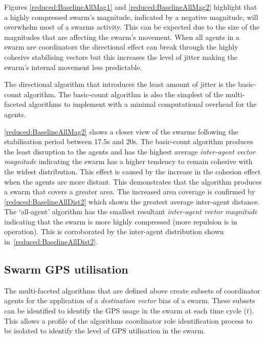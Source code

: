 Figures \ref{reduced:BaselineAllMag1} and \ref{reduced:BaselineAllMag2} highlight that a highly compressed swarm's magnitude, indicated by a negative magnitude, will overwhelm most of a swarms activity. This can be expected due to the size of the magnitudes that are affecting the swarm's movement. When all agents in a swarm are coordinators the directional effect can break through the highly cohesive stabilising vectors but this increases the level of jitter making the swarm's internal movement less predictable.

The directional algorithm that introduces the least amount of jitter is the basic-count algorithm. The basic-count algorithm is also the simplest of the multi-faceted algorithms to implement with a minimal computational overhead for the agents. 

\autoref{reduced:BaselineAllMag2} shows a closer view of the swarms following the stabilisation period between 17.5s and 20s. The basic-count algorithm produces the least disruption to the agents and has the highest average \textit{inter-agent vector magnitude} indicating the swarm has a higher tendency to remain cohesive with the widest distribution. This effect is caused by the increase in the cohesion effect when the agents are more distant. This demonstrates that the algorithm produces a swarm that covers a greater area. The increased area coverage is confirmed by \autoref{reduced:BaselineAllDist2} which shown the greatest average inter-agent distance. The `all-agent' algorithm has the smallest resultant \textit{inter-agent vector magnitude} indicating that the swarm is more highly compressed (more repulsion is in operation). This is corroborated by the inter-agent distribution shown in~\autoref{reduced:BaselineAllDist2}.

\subsection{Swarm GPS utilisation\label{section:compareGPSUages1}}
The multi-faceted algorithms that are defined above create subsets of coordinator agents for the application of a \textit{destination vector} bias of a swarm. These subsets can be identified to identify the GPS usage in the swarm at each time cycle ($t$). This allows a profile of the algorithms coordinator role identification process to be isolated to identify the level of GPS utilisation in the swarm.

